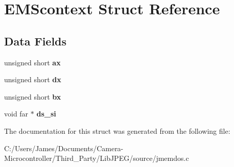 \hypertarget{struct_e_m_scontext}{}\section{E\+M\+Scontext Struct Reference}
\label{struct_e_m_scontext}
\subsection*{Data Fields}
\begin{DoxyCompactItemize}
\item 
\mbox{\label{struct_e_m_scontext_aefac0f43e68315a5cac20b6cce6e3436}} 
unsigned short {\bfseries ax}
\item 
\mbox{\label{struct_e_m_scontext_a81cae824d501dd0819a121d3ac14afc7}} 
unsigned short {\bfseries dx}
\item 
\mbox{\label{struct_e_m_scontext_aa8dc7a6759f334d78f8a7d949fd48269}} 
unsigned short {\bfseries bx}
\item 
\mbox{\label{struct_e_m_scontext_a6d9c8d760489c4c62469b0281d01810a}} 
void far $\ast$ {\bfseries ds\+\_\+si}
\end{DoxyCompactItemize}


The documentation for this struct was generated from the following file\+:\begin{DoxyCompactItemize}
\item 
C\+:/\+Users/\+James/\+Documents/\+Camera-\/\+Microcontroller/\+Third\+\_\+\+Party/\+Lib\+J\+P\+E\+G/source/jmemdos.\+c\end{DoxyCompactItemize}
